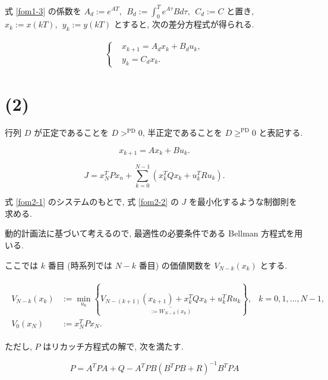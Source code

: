 \documentclass[10pt, fleqn, dvipdfmx]{article}
\begin{document}
式 \eqref{fom1-3} の係数を
$A_d := e^{AT}, ~~ B_d := \int_0^T e^{A \tau} B d\tau, ~~ C_d := C$
と置き, $x_k := x(kT), ~~ y_k := y(kT)$
とすると, 次の差分方程式が得られる.

\begin{align}
	\left\{
	\begin{aligned}
		 & x_{k+1} = A_d x_k + B_d u_k, \\
		 & y_k = C_d x_k.
	\end{aligned}
	\right.
	\label{fom1-4}
\end{align}

\section*{(2)}

行列 $D$ が正定であることを $D >^\mathrm{PD} 0$,
半正定であることを $D \geq^\mathrm{PD} 0$ と表記する.

\begin{equation}
	x_{k+1} = A x_k + B u_k.
	\label{fom2-1}
\end{equation}

\begin{equation}
	J = x_N^T P x_n + \sum_{k=0}^{N-1} \left( x_k^T Q x_k + u_k^T R u_k \right).
	\label{fom2-2}
\end{equation}

式 \eqref{fom2-1} のシステムのもとで,
式 \eqref{fom2-2} の $J$ を最小化するような制御則を求める.

動的計画法に基づいて考えるので, 最適性の必要条件である Bellman 方程式を用いる.

ここでは $k$ 番目 (時系列では $N-k$ 番目) の価値関数を $V_{N-k} (x_k)$ とする.

\begin{align}
	\begin{aligned}
		V_{N-k} (x_k) & := \min_{u_k}
		\left\{
		\underset{:= W_{N-k}(x_k)}{
			\underline{V_{N-(k+1)} (x_{k+1}) + x_k^T Q x_k + u_k^T R u_k}
		}
		\right\},
		              & k = 0, 1, \dots, N-1, \\
		V_{0} (x_N)   & := x_N^T P x_N.
	\end{aligned}
	\label{fom2-3}
\end{align}

ただし, $P$ はリカッチ方程式の解で, 次を満たす.

\begin{equation}
	P = A^T P A + Q - A^T P B ( B^T P B + R )^{-1} B^T P A
\end{equation}
\end{document}
